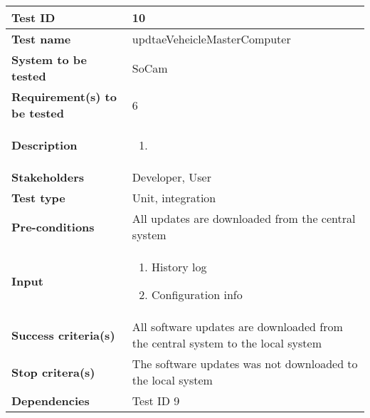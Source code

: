 		\begin{table}[H]
			\begin{tabular}{| p{4cm} | p{10cm} |}
			\hline
			\rowcolor{gray}
				{\bf Test ID} & 10 \\ \hline
				{\bf Test name} & updtaeVeheicleMasterComputer \\ \hline
				{\bf System to be tested} & SoCam \\ \hline
				{\bf Requirement(s) to be tested} & 6 \\ \hline
				{\bf Description} & 
					\begin{enumerate}
						\item 
					\end{enumerate}
				\\ \hline
				{\bf Stakeholders} & Developer, User \\ \hline
				{\bf Test type} & Unit, integration \\ \hline
				{\bf Pre-conditions} & All updates are downloaded from the central system \\ \hline
				{\bf Input} & 
					\begin{enumerate}
						\item History log
						\item Configuration info
					\end{enumerate}
				\\ \hline
				{\bf Success criteria(s)} &  All software updates are downloaded from the central system 
						to the local system \\ \hline
				{\bf Stop critera(s)} &  The software updates was not downloaded to the 
					local system \\ \hline
				{\bf Dependencies} & Test ID 9 \\ \hline
			\end{tabular}
		\end{table}

